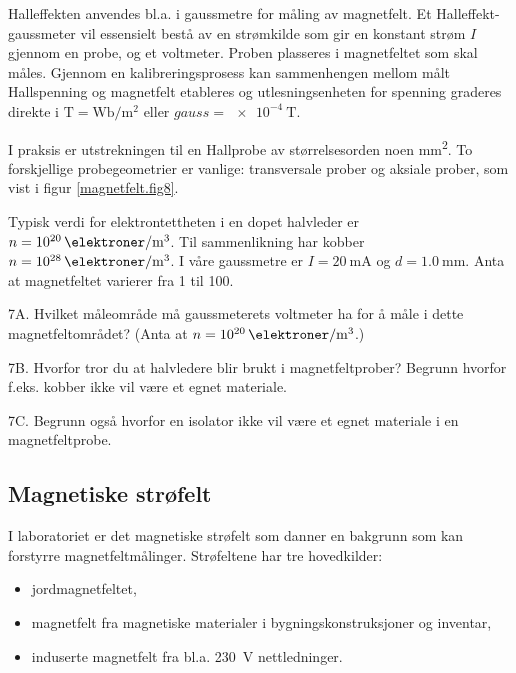 \documentclass[../Elmag-labhefte-2020.tex]{subfiles}
\begin{document}

Halleffekten anvendes bl.a. i gaussmetre for måling av magnetfelt. Et Halleffekt-gaussmeter vil essensielt bestå av en strømkilde som gir en konstant strøm $I$ gjennom en probe,  og et voltmeter. Proben plasseres i magnetfeltet som skal måles. Gjennom en kalibreringsprosess kan sammenhengen mellom målt Hallspenning og magnetfelt etableres og utlesningsenheten for spenning graderes direkte i $\si{\tesla} = \si{\weber/\square\m}$ eller $\si{gauss} = \SI{e-4}{\tesla}$.

I praksis er utstrekningen til en Hallprobe av størrelsesorden noen \si{\square\mm}. To forskjellige probegeometrier er vanlige: transversale prober og aksiale prober, som vist i figur \ref{magnetfelt.fig8}.

Typisk verdi for elektrontettheten i en dopet halvleder er $n = \SI{e20}{\elektroner/\m\cubed}$. Til sammenlikning har kobber $n = \SI{e28}{\elektroner/\m\cubed}$. I våre gaussmetre er $I = \SI{20}{\milli\ampere}$ og $d = \SI{1,0}{\mm}$. Anta at magnetfeltet varierer fra 1 til \SI{100}{\gauss}.

{\itsf 7A. Hvilket måleområde må gaussmeterets voltmeter ha for å måle i dette magnetfeltområdet? (Anta at $n = \SI{e20}{\elektroner/\m\cubed}$.)

7B. Hvorfor tror du at halvledere blir brukt i magnetfeltprober? Begrunn hvorfor f.eks. kobber ikke vil være et egnet materiale.
 
7C. Begrunn også hvorfor en isolator ikke vil være et egnet materiale i en magnetfeltprobe.
}

\subsection{Magnetiske strøfelt}

I laboratoriet er det magnetiske strøfelt som danner en bakgrunn som kan forstyrre magnetfeltmålinger. Strøfeltene har tre hovedkilder: 
\vspace{-4mm}
\begin{itemize}
    \item jordmagnetfeltet,
    \item magnetfelt fra magnetiske materialer i bygningskonstruksjoner og inventar,
    \item induserte magnetfelt fra bl.a. \SI{230}{\volt} nettledninger.
\end{itemize}
\end{document}
